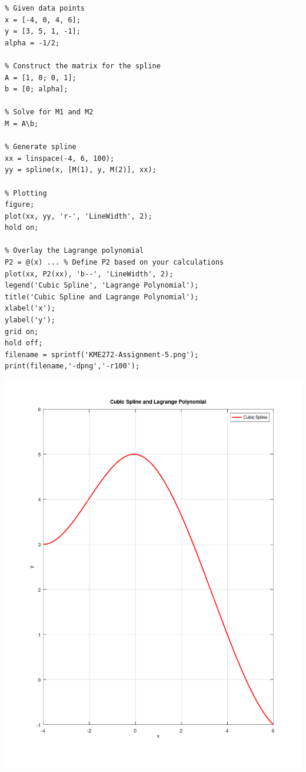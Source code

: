 \documentclass[11pt]{article}
\begin{document}
\begin{verbatim}
% Given data points
x = [-4, 0, 4, 6];
y = [3, 5, 1, -1];
alpha = -1/2;

% Construct the matrix for the spline
A = [1, 0; 0, 1];
b = [0; alpha];

% Solve for M1 and M2
M = A\b;

% Generate spline
xx = linspace(-4, 6, 100);
yy = spline(x, [M(1), y, M(2)], xx);

% Plotting
figure;
plot(xx, yy, 'r-', 'LineWidth', 2);
hold on;

% Overlay the Lagrange polynomial
P2 = @(x) ... % Define P2 based on your calculations
plot(xx, P2(xx), 'b--', 'LineWidth', 2);
legend('Cubic Spline', 'Lagrange Polynomial');
title('Cubic Spline and Lagrange Polynomial');
xlabel('x');
ylabel('y');
grid on;
hold off;
filename = sprintf('KME272-Assignment-5.png');
print(filename,'-dpng','-r100');
\end{verbatim}

\begin{center}
\includegraphics[width=.9\linewidth]{KME272-Assignment-5.png}
\end{center}
\end{document}
